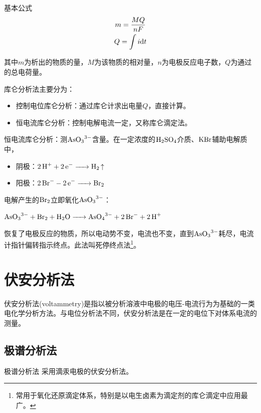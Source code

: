 \begin{theorem*}{基本公式}{}
	\begin{gather*}
	m=\dfrac{MQ}{nF}\\
	Q=\int i\mathrm{d}t
	\end{gather*}
	
	其中$m$为析出的物质的量，$M$为该物质的相对量，$n$为电极反应电子数，$Q$为通过的总电荷量。
\end{theorem*}

库仑分析法主要分为：

\begin{itemize}
	\item 控制电位库仑分析：通过库仑计求出电量$Q$，直接计算。
	\item 恒电流库仑分析：控制电解电流一定，又称库仑滴定法。
\end{itemize}

\begin{example}
	恒电流库仑分析：测$\ce{AsO3^3-}$含量。在一定浓度的$\ce{H2SO4}$介质、$\ce{KBr}$辅助电解质中，
	
	\begin{itemize}
		\item 阴极：$\ce{2H+ + 2e- -> H2 ^ }$
		\item 阳极：$\ce{2Br- - 2e- -> Br2}$
	\end{itemize}

	电解产生的$\ce{Br2}$立即氧化$\ce{AsO3^3-}$：
	
	$\ce{AsO3^3- + Br2 + H2O -> AsO4^3- + 2Br- + 2H+}$
	
	恢复了电极反应的物质，所以电动势不变，电流也不变，直到$\ce{AsO3^3-}$耗尽，电流计指针偏转指示终点。此法叫死停终点法\footnote{常用于氧化还原滴定体系，特别是以电生卤素为滴定剂的库仑滴定中应用最广。}。
\end{example}


\section{伏安分析法}

伏安分析法(voltammetry)是指以被分析溶液中电极的电压-电流行为为基础的一类电化学分析方法。与电位分析法不同，伏安分析法是在一定的电位下对体系电流的测量。

\subsection{极谱分析法}
\begin{definition*}{极谱分析法}{}
	采用滴汞电极的伏安分析法。
\end{definition*}

